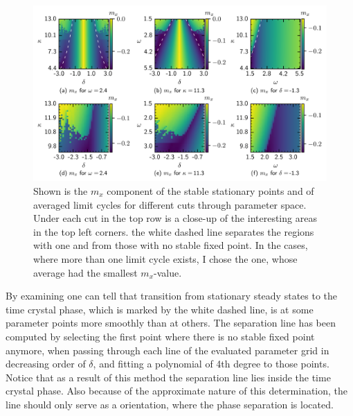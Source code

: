 \begin{figure}[H]
    \hspace*{-1.2cm}
    \includegraphics[scale=1]{pictures/stable_fixp_extended_withline_dashed.png}
    \caption{Shown is the $m_x$ component of the stable stationary points and of averaged limit cycles for different cuts through parameter space. Under each cut in the top row is a close-up of the interesting areas in the top left corners. the white dashed line separates the regions with one and from those with no stable fixed point. In the cases, where more than one limit cycle exists, I chose the one, whose average had the smallest $m_x$-value.}
    \label{fig:fixedpoint_colormap}
\end{figure}
By examining  one can tell that transition from stationary steady states to the time crystal phase, which is marked by the white dashed line, is at some parameter points more smoothly than at others. The separation line has been computed by selecting the first point where there is no stable fixed point anymore, when passing through each line of the evaluated parameter grid in decreasing order of $\delta$, and fitting a polynomial of 4th degree to those points. Notice that as a result of this method the separation line lies inside the time crystal phase. Also because of the approximate nature of this determination, the line should only serve as a orientation, where the phase separation is located.\\\\
